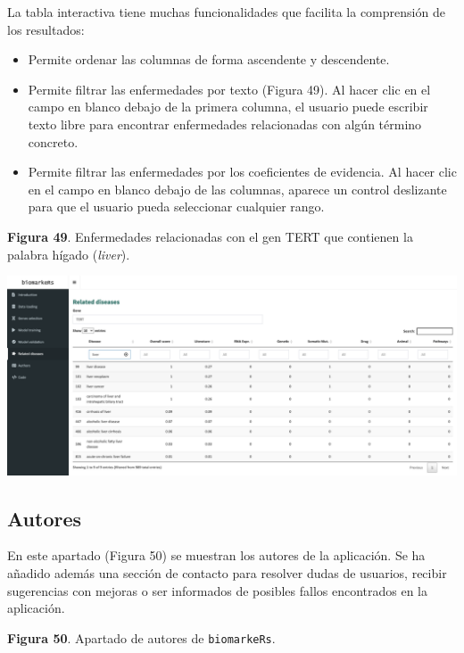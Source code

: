 La tabla interactiva tiene muchas funcionalidades que facilita la comprensión de los resultados:
\begin{itemize}
	\item Permite ordenar las columnas de forma ascendente y descendente.
	\item Permite filtrar las enfermedades por texto (Figura 49).  Al hacer clic en el campo en blanco debajo de la primera columna, el usuario puede escribir texto libre para encontrar enfermedades relacionadas con algún término concreto.
	\item Permite filtrar las enfermedades por los coeficientes de evidencia. Al hacer clic en el campo en blanco debajo de las columnas, aparece un control deslizante para que el usuario pueda seleccionar cualquier rango.
\end{itemize}

\newpage
\begin{center}
	\textbf{Figura 49}. Enfermedades relacionadas con el gen TERT que contienen la palabra hígado (\textit{liver}).
\end{center}

\begin{center}
	\includegraphics[width=.90\textwidth]{figuras/49_related_diseases_filtered.png} \\
\end{center}

\subsection{Autores}

En este apartado (Figura 50) se muestran los autores de la aplicación. Se ha añadido además una sección de contacto para resolver dudas de usuarios, recibir sugerencias con mejoras o ser informados de posibles fallos encontrados en la aplicación.

\begin{center}
	\textbf{Figura 50}. Apartado de autores de \texttt{biomarkeRs}.
\end{center}

